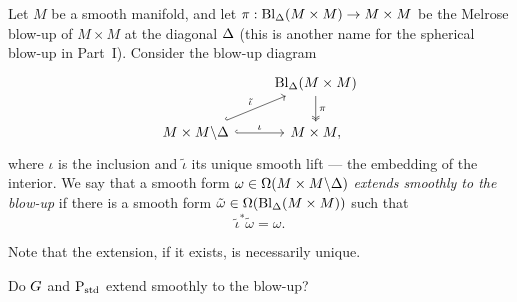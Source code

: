 \documentclass[\MainFolder/Text.tex]{subfiles}
\begin{document}
\begin{Definition}\label{Def:Esdas}
Let $M$ be a smooth manifold, and let $\pi: \mathrm{Bl}_\Delta(M\times M)\rightarrow M\times M$ be the Melrose blow-up of $M\times M$ at the diagonal $\Delta$ (this is another name for the spherical blow-up in Part~I). Consider the blow-up diagram
$$\begin{tikzcd}
 & \Bl_\Diag(M\times M)\arrow[two heads]{d}{\pi} \\
 M\times M\backslash \Diag \arrow[hook]{r}{\iota}\arrow[hook]{ru}{\tilde{\iota}} & M\times M,
\end{tikzcd}$$
where $\iota$ is the inclusion and $\tilde{\iota}$ its unique smooth lift --- the embedding of the interior. We say that a smooth form $\omega\in\Omega(M\times M\backslash\Delta)$ \emph{extends smoothly to the blow-up} if there is a smooth form $\tilde{\omega}\in \Omega(\mathrm{Bl}_\Delta(M\times M))$ such that 
$$ \tilde{\iota}^*\tilde{\omega}=\omega. $$
\end{Definition}

Note that the extension, if it exists, is necessarily unique.

\begin{Question}
Do $G$ and $\mathrm{P}_{\mathrm{std}}$ extend smoothly to the blow-up?
\end{Question}
\end{document}
